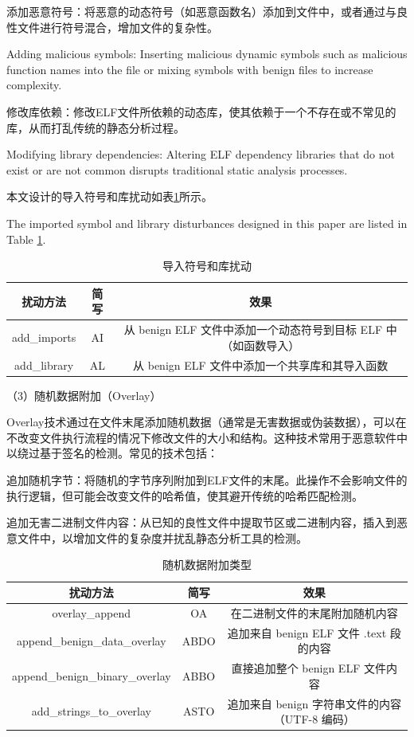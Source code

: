 添加恶意符号：将恶意的动态符号（如恶意函数名）添加到文件中，或者通过与良性文件进行符号混合，增加文件的复杂性。

Adding malicious symbols: Inserting malicious dynamic symbols such as malicious function names into the file or mixing symbols with benign files to increase complexity.

修改库依赖：修改ELF文件所依赖的动态库，使其依赖于一个不存在或不常见的库，从而打乱传统的静态分析过程。

Modifying library dependencies: Altering ELF dependency libraries that do not exist or are not common disrupts traditional static analysis processes.

本文设计的导入符号和库扰动如表\ref{tab:4.2}所示。

The imported symbol and library disturbances designed in this paper are listed in Table \ref{tab:4.2}.

\begin{table}[htbp]
	\centering
	\caption{导入符号和库扰动}\label{tab:4.2}
	\begin{tabular*}{\textwidth}{@{\extracolsep{\fill}}ccc}
		\toprule
		扰动方法 & 简写 & 效果 \\
		\midrule
		add\_imports & AI & 从 benign ELF 文件中添加一个动态符号到目标 ELF 中（如函数导入） \\
		add\_library & AL & 从 benign ELF 文件中添加一个共享库和其导入函数 \\
		\bottomrule
	\end{tabular*}
\end{table}


（3）随机数据附加（Overlay）

Overlay技术通过在文件末尾添加随机数据（通常是无害数据或伪装数据），可以在不改变文件执行流程的情况下修改文件的大小和结构。这种技术常用于恶意软件中以绕过基于签名的检测。常见的技术包括：

追加随机字节：将随机的字节序列附加到ELF文件的末尾。此操作不会影响文件的执行逻辑，但可能会改变文件的哈希值，使其避开传统的哈希匹配检测。

追加无害二进制文件内容：从已知的良性文件中提取节区或二进制内容，插入到恶意文件中，以增加文件的复杂度并扰乱静态分析工具的检测。

\begin{table}[htbp]
	\centering
	\caption{随机数据附加类型}\label{tab:4.3}
	\begin{tabular*}{\textwidth}{@{\extracolsep{\fill}}ccc}
		\toprule
		扰动方法 & 简写 & 效果 \\
		\midrule
		overlay\_append & OA & 在二进制文件的末尾附加随机内容 \\
		append\_benign\_data\_overlay & ABDO & 追加来自 benign ELF 文件 .text 段的内容 \\
		append\_benign\_binary\_overlay & ABBO & 直接追加整个 benign ELF 文件内容 \\
		add\_strings\_to\_overlay & ASTO & 追加来自 benign 字符串文件的内容（UTF-8 编码） \\
		\bottomrule
	\end{tabular*}
\end{table}

